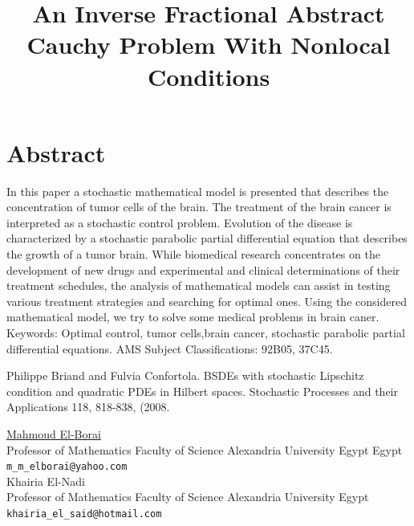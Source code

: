 \documentclass[article, A4, 11pt]{llncs}%
\begin{document}
\section*{Abstract}

 In this paper a stochastic mathematical model is presented that describes the concentration of tumor cells of the brain. The treatment of the brain cancer is interpreted as a stochastic  control problem. Evolution of the disease is characterized by a stochastic parabolic partial differential equation that describes the growth of a tumor brain.
While biomedical research concentrates on the development of new drugs and experimental and clinical determinations of their treatment schedules, the analysis of mathematical models can assist in testing various treatment strategies and searching for optimal ones.
Using the considered mathematical model, we try to solve some medical problems in brain caner.
Keywords: Optimal control, tumor cells,brain cancer, stochastic parabolic partial differential equations.
AMS Subject Classifications: 92B05, 37C45.



\begin{thebibliography}{10}
{\sc Philippe Briand and Fulvia Confortola}. {BSDEs with stochastic Lipschitz condition and quadratic PDEs in Hilbert spaces}. Stochastic Processes and their Applications 118, 818-838, (2008.
\end{thebibliography} %

\title{An Inverse Fractional Abstract Cauchy Problem With Nonlocal Conditions}
 \author{} \institute{}
\maketitle
\begin{center}
{\large \underline{Mahmoud El-Borai}}\\
Professor of Mathematics Faculty of Science Alexandria University Egypt Egypt\\
{\tt \tt m\_m\_elborai@yahoo.com}
\\ \vspace{4mm}
{\large Khairia El-Nadi}\\
Professor of Mathematics Faculty of Science Alexandria University  Egypt\\
{\tt \tt khairia\_el\_said@hotmail.com}
\end{center}
\end{document}
